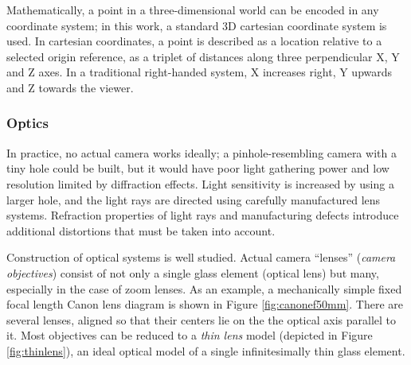 

Mathematically, a point in a three-dimensional world can be encoded in any coordinate system;
in this work, a standard 3D cartesian coordinate system is used.
In cartesian coordinates, a point is described as a location relative to a selected origin reference, as a triplet of distances along three perpendicular X, Y and Z axes. %
In a traditional right-handed system, X increases right, Y upwards and Z towards the viewer.



\subsubsection{Optics} %



In practice, no actual camera works ideally; a pinhole-resembling camera with a tiny hole could be built, but it would have poor light gathering power and low resolution limited by diffraction effects. \cite{todo}
Light sensitivity is increased by using a larger hole, and the light rays are directed using carefully manufactured lens systems.
Refraction properties of light rays and manufacturing defects introduce additional distortions that must be taken into account.

Construction of optical systems is well studied. \cite{kingslake1989history,greenleaf1950photographic}
Actual camera ``lenses'' (\emph{camera objectives}) consist of not only a single glass element (optical lens) but many, especially in the case of zoom lenses.
As an example, a mechanically simple fixed focal length Canon lens diagram is shown in Figure \ref{fig:canonef50mm}.
There are several lenses, aligned so that their centers lie on the the optical axis parallel to it.
Most objectives can be reduced to a \emph{thin lens} model (depicted in Figure \ref{fig:thinlens}), an ideal optical model of a single infinitesimally thin glass element.

